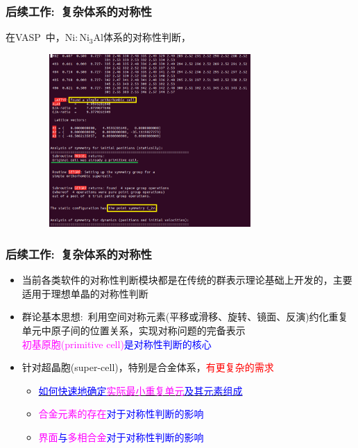 \documentclass[cjk,slidestop,handout,compress,mathserif,blue]{beamer}	%
\begin{document}
\frame
{
	\frametitle{后续工作:~复杂体系的对称性}
	在\textrm{VASP~}中，$\mathrm{Ni}:\mathrm{Ni}_3\mathrm{Al}$体系的对称性判断，
\begin{figure}[h!]
\centering
\includegraphics[height=2.6in,width=3.5in,viewport=0 0 680 530,clip]{Figures/VASP_Alloy_Ni-Al_symmetry.png}
\label{Alloy_Ni-Al-OUTCAR}
\end{figure} 
}

\frame
{
	\frametitle{后续工作:~复杂体系的对称性}
	\begin{itemize}
   		\setlength{\itemsep}{15pt}
		\item 当前各类软件的对称性判断模块都是在传统的群表示理论基础上开发的，主要适用于理想单晶的对称性判断
		\item 群论基本思想:~利用空间对称元素(平移或滑移、旋转、镜面、反演)约化重复单元中原子间的位置关系，实现对称问题的完备表示\\
			\textcolor{blue}{\textcolor{magenta}{初基原胞(\textrm{primitive cell})}是对称性判断的核心}
		\item 针对超晶胞(\textrm{super-cell})，特别是合金体系，\textcolor{red}{有更复杂的需求}
			\begin{itemize}
   				\setlength{\itemsep}{10pt}
				\item \underline{\textcolor{blue}{如何快速地确定\textcolor{magenta}{实际最小重复单元}及其元素组成}}
				\item \textcolor{blue}{\textcolor{magenta}{合金元素的存在}对于对称性判断的影响}
				\item \textcolor{blue}{\textcolor{magenta}{界面}与\textcolor{magenta}{多相合金}对于对称性判断的影响}
			\end{itemize}
	\end{itemize}
}
\end{document}
